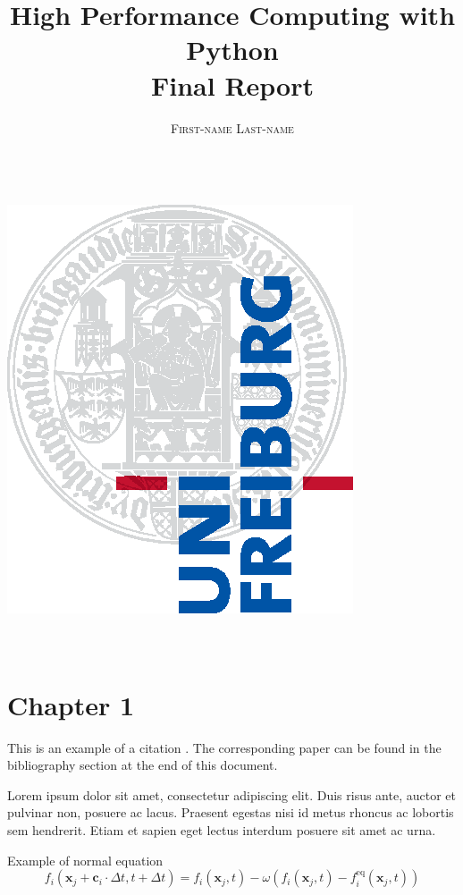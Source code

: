 \documentclass[a4paper,11pt]{report}
\title{\Huge \textbf{High Performance Computing with Python} \vspace{4mm} \\ \huge Final Report}
\author{\textsc{First-name Last-name} \\ \vspace{3mm}\text{matriculation number}  \\
\vspace{3mm}\text{email-address}}
\begin{document}
    \makeatletter
    \begin{titlepage}
        \begin{center}
            \includegraphics[width=0.5\linewidth]{logos/Uni_Logo-Grundversion_E1_A4_CMYK.eps}\\[4ex]
            {\huge \bfseries  \@title }\\[2ex]
            {\LARGE  \@author}\\[30ex]
            {\large \@date}
        \end{center}
    \end{titlepage}
    \makeatother
    \thispagestyle{empty}
    \newpage



    \tableofcontents


    \chapter{Chapter 1}

    This is an example of a citation \cite{timm2016lattice}. The corresponding paper can be found in the bibliography section at the end of this document.

    Lorem ipsum dolor sit amet, consectetur adipiscing elit. Duis risus ante, auctor et pulvinar non, posuere ac lacus. Praesent egestas nisi id metus rhoncus ac lobortis sem hendrerit. Etiam et sapien eget lectus interdum posuere sit amet ac urna.

    Example of normal equation
    \begin{equation}
        \label{eq:LBE}
        f_i(\mathbf{x}_j+\mathbf{c}_i\cdot\Delta t,t+\Delta t)=f_i(\mathbf{x}_j,t)
        -\omega \left( f_i(\mathbf{x}_j,t)-f_i^\text{eq}(\mathbf{x}_j,t) \right)
    \end{equation}
\end{document}
